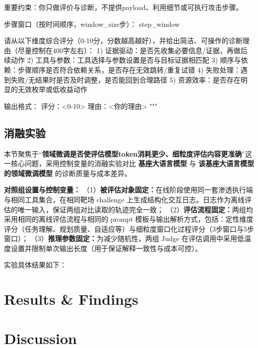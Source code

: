 \documentclass[a4paper, twocolumn]{article}
\begin{document}
重要约束：你只做评价与诊断，不提供payload、利用细节或可执行攻击步骤。

步骤窗口（按时间顺序，{window_size}步）：
{step_window}

请从以下维度综合评分（0-10分，分数越高越好），并给出简洁、可操作的诊断理由（尽量控制在400字左右）：
1) 证据驱动：是否先收集必要信息/证据，再做后续动作
2) 工具与参数：工具选择与参数设置是否与目标证据相匹配
3) 顺序与依赖：步骤顺序是否符合依赖关系，是否存在无效跳转/重复试错
4) 失败处理：遇到失败/无结果时是否及时调整，是否能回到合理路径
5) 资源效率：是否存在明显的无效枚举或低收益动作

输出格式：
评分：<0-10>
理由：<你的理由>
"""

\subsection{消融实验}
本节聚焦于“\textbf{领域微调是否使评估模型token消耗更少、细粒度评估内容更准确}”这一核心问题，采用控制变量的消融实验对比 \textbf{基座大语言模型} 与 \textbf{该基座大语言模型的领域微调模型} 的诊断质量与成本差异。

\textbf{对照组设置与控制变量：}
（1）\textbf{被评估对象固定：}在线阶段使用同一套渗透执行端与相同工具集合，在相同靶场 challenge 上生成结构化交互日志。日志作为离线评估的唯一输入，保证两组对比读取的轨迹完全一致；
（2）\textbf{评估流程固定：}两组均采用相同的离线评估流程与相同的 prompt 模板与输出解析方式，包括：定性维度评分（任务理解、规划质量、自适应等）与细粒度窗口化过程评分（3步窗口与5步窗口）；
（3）\textbf{推理参数固定：}为减少随机性，两组 Judge 在评估调用中采用低温度设置并限制单次输出长度（用于保证解释一致性与成本可控）。

实验具体结果如下：

\section{Results & Findings}



\section{Discussion}



% 
% 
% 
% 
% 
% 


\clearpage
\end{document}
